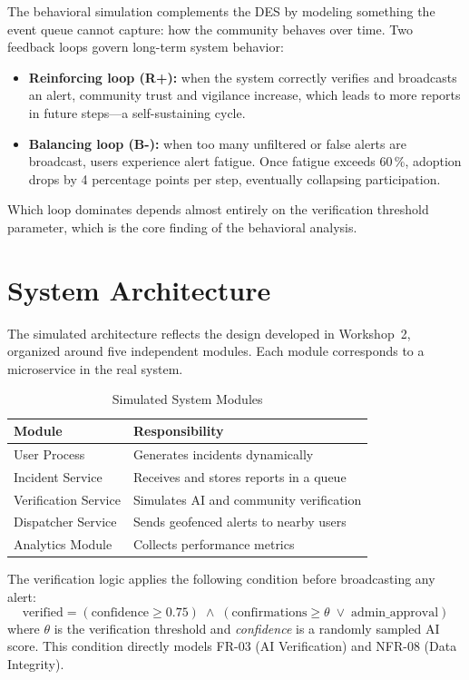 \documentclass[conference,a4paper,10pt]{IEEEtran}
\begin{document}
The behavioral simulation complements the DES by modeling something
the event queue cannot capture: how the community behaves over time.
Two feedback loops govern long-term system behavior:

\begin{itemize}
  \item \textbf{Reinforcing loop (R+):} when the system correctly
    verifies and broadcasts an alert, community trust and vigilance
    increase, which leads to more reports in future steps---a
    self-sustaining cycle.
  \item \textbf{Balancing loop (B-):} when too many unfiltered or
    false alerts are broadcast, users experience alert fatigue. Once
    fatigue exceeds 60\,\%, adoption drops by 4 percentage points
    per step, eventually collapsing participation.
\end{itemize}

Which loop dominates depends almost entirely on the verification
threshold parameter, which is the core finding of the behavioral
analysis.

\section{System Architecture}

The simulated architecture reflects the design developed in
Workshop~2, organized around five independent modules. Each module
corresponds to a microservice in the real system.

\begin{table}[H]
\caption{Simulated System Modules}
\label{tab:modules}\centering\small
\begin{tabular}{ll}
\toprule
\textbf{Module} & \textbf{Responsibility}\\
\midrule
User Process        & Generates incidents dynamically\\
Incident Service    & Receives and stores reports in a queue\\
Verification Service & Simulates AI and community verification\\
Dispatcher Service  & Sends geofenced alerts to nearby users\\
Analytics Module    & Collects performance metrics\\
\bottomrule
\end{tabular}
\end{table}

The verification logic applies the following condition before
broadcasting any alert:
\[
\text{verified} = (\text{confidence} \geq 0.75)
\;\land\;
(\text{confirmations} \geq \theta \;\lor\; \text{admin\_approval})
\]
where $\theta$ is the verification threshold and \textit{confidence}
is a randomly sampled AI score. This condition directly models
FR-03 (AI Verification) and NFR-08 (Data Integrity).
\end{document}
